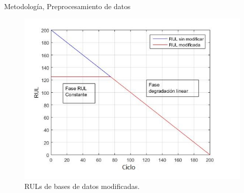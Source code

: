 \begin{frame}{Metodología, Preprocesamiento de datos}
    \begin{figure}
        \centering
        \includegraphics[scale=0.55]{animate/RUL_modificada.jpg}
        \caption{RULs de bases de datos modificadas.}
        \label{fig:my_label}
    \end{figure}
\end{frame}

